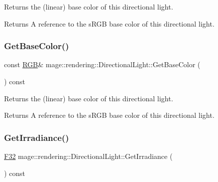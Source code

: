 Returns the (linear) base color of this directional light.

\begin{DoxyReturn}{Returns}
A reference to the s\+R\+GB base color of this directional light. 
\end{DoxyReturn}
\hypertarget{classmage_1_1rendering_1_1_directional_light_aca3e27ba1d32b1146d3250827c1efb5f}{}\label{classmage_1_1rendering_1_1_directional_light_aca3e27ba1d32b1146d3250827c1efb5f} 
\subsubsection{\texorpdfstring{Get\+Base\+Color()}{GetBaseColor()}\hspace{0.1cm}{\footnotesize\ttfamily [2/2]}}
{\footnotesize\ttfamily const \hyperlink{structmage_1_1_r_g_b}{R\+GB}\& mage\+::rendering\+::\+Directional\+Light\+::\+Get\+Base\+Color (\begin{DoxyParamCaption}{ }\end{DoxyParamCaption}) const\hspace{0.3cm}{\ttfamily [noexcept]}}

Returns the (linear) base color of this directional light.

\begin{DoxyReturn}{Returns}
A reference to the s\+R\+GB base color of this directional light. 
\end{DoxyReturn}
\hypertarget{classmage_1_1rendering_1_1_directional_light_a1cba2b0099366af146c3ccf364946bf8}{}\label{classmage_1_1rendering_1_1_directional_light_a1cba2b0099366af146c3ccf364946bf8} 
\subsubsection{\texorpdfstring{Get\+Irradiance()}{GetIrradiance()}}
{\footnotesize\ttfamily \hyperlink{namespacemage_aa97e833b45f06d60a0a9c4fc22ae02c0}{F32} mage\+::rendering\+::\+Directional\+Light\+::\+Get\+Irradiance (\begin{DoxyParamCaption}{ }\end{DoxyParamCaption}) const\hspace{0.3cm}{\ttfamily [noexcept]}}

